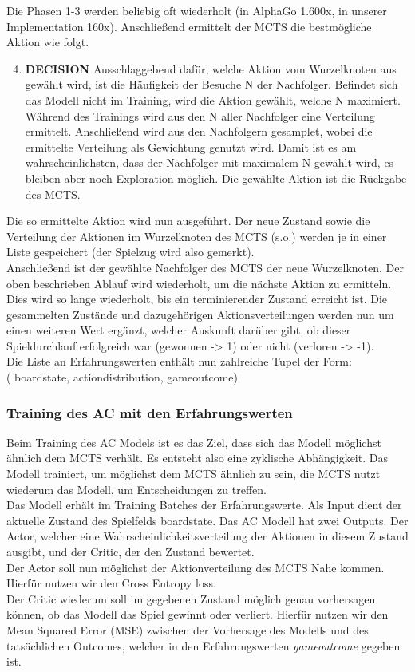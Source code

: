 	Die Phasen 1-3 werden beliebig oft wiederholt (in AlphaGo 1.600x, in unserer Implementation 160x). Anschließend ermittelt der MCTS die bestmögliche Aktion wie folgt.
\begin{enumerate}\setcounter{enumi}{3}
	\item \textbf{DECISION}
	Ausschlaggebend dafür, welche Aktion vom Wurzelknoten aus gewählt wird, ist die Häufigkeit der Besuche N der Nachfolger. 
	Befindet sich das Modell nicht im Training, wird die Aktion gewählt, welche N maximiert.
	Während des Trainings wird aus den N aller Nachfolger eine Verteilung ermittelt. Anschließend wird aus den Nachfolgern gesamplet, wobei die ermittelte Verteilung als Gewichtung genutzt wird. Damit ist es am wahrscheinlichsten, dass der Nachfolger mit maximalem N gewählt wird, es bleiben aber noch Exploration möglich.
	Die gewählte Aktion ist die Rückgabe des MCTS.
\end{enumerate}
Die so ermittelte Aktion wird nun ausgeführt. Der neue Zustand sowie die Verteilung der Aktionen im Wurzelknoten des MCTS (s.o.) werden je in einer Liste gespeichert (der Spielzug wird also gemerkt).
\\
Anschließend ist der gewählte Nachfolger des MCTS der neue Wurzelknoten. Der oben beschrieben Ablauf wird wiederholt, um die nächste Aktion zu ermitteln.
\\
Dies wird so lange wiederholt, bis ein terminierender Zustand erreicht ist. Die gesammelten Zustände und dazugehörigen Aktionsverteilungen werden nun um einen weiteren Wert ergänzt, welcher Auskunft darüber gibt, ob dieser Spieldurchlauf erfolgreich war (gewonnen -> 1) oder nicht (verloren -> -1).
\\
Die Liste an Erfahrungswerten enthält nun zahlreiche Tupel der Form:\\
( board\textunderscore{}state, action\textunderscore{}distribution, game\textunderscore{}outcome)


\subsubsection*{Training des AC mit den Erfahrungswerten}
Beim Training des AC Models ist es das Ziel, dass sich das Modell möglichst ähnlich dem MCTS verhält. Es entsteht also eine zyklische Abhängigkeit. Das Modell trainiert, um möglichst dem MCTS ähnlich zu sein, die MCTS nutzt wiederum das Modell, um Entscheidungen zu treffen. 
\\
Das Modell erhält im Training Batches der Erfahrungswerte. Als Input dient der aktuelle Zustand des Spielfelds board\textunderscore{}state. Das AC Modell hat zwei Outputs. Der Actor, welcher eine Wahrscheinlichkeitsverteilung der Aktionen in diesem Zustand ausgibt, und der Critic, der den Zustand bewertet. 
\\
Der Actor soll nun möglichst der Aktionverteilung des MCTS Nahe kommen. Hierfür nutzen wir den Cross Entropy loss.
\\
Der Critic wiederum soll im gegebenen Zustand möglich genau vorhersagen können, ob das Modell das Spiel gewinnt oder verliert. Hierfür nutzen wir den Mean Squared Error (MSE) zwischen der Vorhersage des Modells und des tatsächlichen Outcomes, welcher in den Erfahrungswerten \textit{game\textunderscore{}outcome} gegeben ist.

